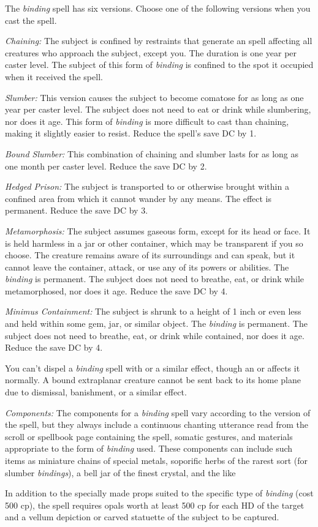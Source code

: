 {	The \emph{binding} spell has six versions. Choose one of the following versions when you cast the spell.

	\textit{Chaining:}
	The subject is confined by restraints that generate an  spell affecting all creatures who approach the subject, except you. The duration is one year per caster level. The subject of this form of \emph{binding} is confined to the spot it occupied when it received the spell.

	\textit{Slumber:}
	This version causes the subject to become comatose for as long as one year per caster level. The subject does not need to eat or drink while slumbering, nor does it age. This form of \emph{binding} is more difficult to cast than chaining, making it slightly easier to resist. Reduce the spell's save DC by 1.

	\textit{Bound Slumber:}
	This combination of chaining and slumber lasts for as long as one month per caster level. Reduce the save DC by 2.

	\textit{Hedged Prison:}
	The subject is transported to or otherwise brought within a confined area from which it cannot wander by any means. The effect is permanent. Reduce the save DC by 3.

	\textit{Metamorphosis:}
	The subject assumes gaseous form, except for its head or face. It is held harmless in a jar or other container, which may be transparent if you so choose. The creature remains aware of its surroundings and can speak, but it cannot leave the container, attack, or use any of its powers or abilities. The \emph{binding} is permanent. The subject does not need to breathe, eat, or drink while metamorphosed, nor does it age. Reduce the save DC by 4.

	\textit{Minimus Containment:}
	The subject is shrunk to a height of 1 inch or even less and held within some gem, jar, or similar object. The \emph{binding} is permanent. The subject does not need to breathe, eat, or drink while contained, nor does it age. Reduce the save DC by 4.

	You can't dispel a \emph{binding} spell with  or a similar effect, though an  or  affects it normally. A bound extraplanar creature cannot be sent back to its home plane due to dismissal, banishment, or a similar effect.

	\textit{Components:}
	The components for a \emph{binding} spell vary according to the version of the spell, but they always include a continuous chanting utterance read from the scroll or spellbook page containing the spell, somatic gestures, and materials appropriate to the form of \emph{binding} used. These components can include such items as miniature chains of special metals, soporific herbs of the rarest sort (for slumber \emph{bindings}), a bell jar of the finest crystal, and the like

	In addition to the specially made props suited to the specific type of \emph{binding} (cost 500 cp), the spell requires opals worth at least 500 cp for each HD of the target and a vellum depiction or carved statuette of the subject to be captured.

}
